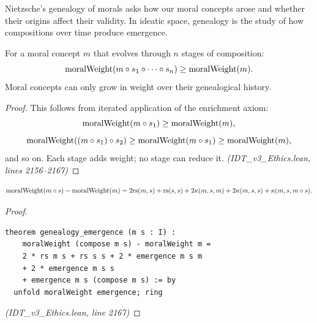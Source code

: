 Nietzsche's genealogy of morals asks how our moral concepts arose and
whether their origins affect their validity. In ideatic space, genealogy
is the study of how compositions over time produce emergence.

\begin{theorem}
\label{thm:genealogy-growth}
For a moral concept $m$ that evolves through $n$ stages of composition:
\[
  \mathrm{moralWeight}(m \circ s_1 \circ \cdots \circ s_n)
  \geq \mathrm{moralWeight}(m).
\]
Moral concepts can only grow in weight over their genealogical history.
\end{theorem}

\begin{proof}
This follows from iterated application of the enrichment axiom:
\[
  \mathrm{moralWeight}(m \circ s_1) \geq \mathrm{moralWeight}(m),
\]
\[
  \mathrm{moralWeight}((m \circ s_1) \circ s_2)
  \geq \mathrm{moralWeight}(m \circ s_1)
  \geq \mathrm{moralWeight}(m),
\]
and so on. Each stage adds weight; no stage can reduce it.
\textit{(IDT\_v3\_Ethics.lean, lines 2156--2167)}
\end{proof}

\begin{theorem}
\label{thm:genealogy-emergence}
\[
  \mathrm{moralWeight}(m \circ s) - \mathrm{moralWeight}(m)
  = 2\mathrm{rs}(m, s) + \mathrm{rs}(s, s) + 2\kappa(m, s, m) + 2\kappa(m, s, s)
  + \kappa(m, s, m \circ s).
\]
\end{theorem}

\begin{proof}
\begin{lstlisting}
theorem genealogy_emergence (m s : I) :
    moralWeight (compose m s) - moralWeight m =
    2 * rs m s + rs s s + 2 * emergence m s m
    + 2 * emergence m s s
    + emergence m s (compose m s) := by
  unfold moralWeight emergence; ring
\end{lstlisting}
\textit{(IDT\_v3\_Ethics.lean, line 2167)}
\end{proof}

